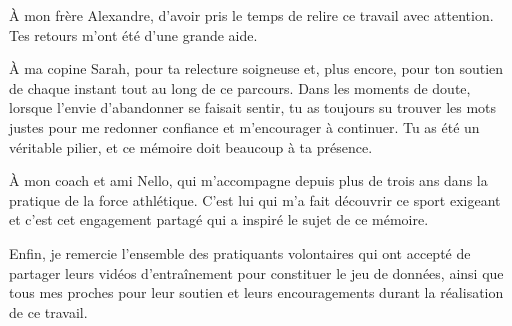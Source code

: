 \documentclass[a4paper,11pt,notitlepage]{report}
\theoremstyle{definition}
\begin{document}
À mon frère Alexandre, d'avoir pris le temps de relire ce travail avec attention. Tes retours m'ont été d'une grande aide.

À ma copine Sarah, pour ta relecture soigneuse et, plus encore, pour ton soutien de chaque instant tout au long de ce parcours. Dans les moments de doute, lorsque l'envie d'abandonner se faisait sentir, tu as toujours su trouver les mots justes pour me redonner confiance et m'encourager à continuer. Tu as été un véritable pilier, et ce mémoire doit beaucoup à ta présence.

À mon coach et ami Nello, qui m'accompagne depuis plus de trois ans dans la pratique de la force athlétique. C'est lui qui m'a fait découvrir ce sport exigeant et c'est cet engagement partagé qui a inspiré le sujet de ce mémoire.

Enfin, je remercie l'ensemble des pratiquants volontaires qui ont accepté de partager leurs vidéos d'entraînement pour constituer le jeu de données, ainsi que tous mes proches pour leur soutien et leurs encouragements durant la réalisation de ce travail.


\newpage
\tableofcontents
\normalsize

\newpage



\setlength{\parindent}{12pt}
\setlength{\parskip}{1ex plus 0.5ex minus 0.2ex}











\newpage

\appendix


\end{document}
